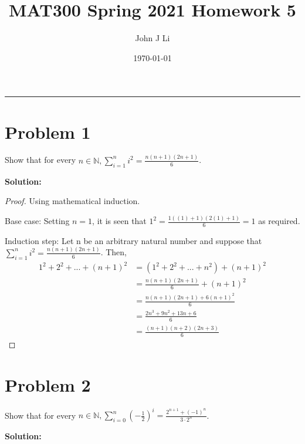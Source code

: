 \documentclass{article}
\title{MAT300 Spring 2021 Homework 5}
\date{\today}
\author{John J Li}
\begin{document}
    \maketitle
    \thispagestyle{empty}
    \noindent\rule{\textwidth}{0.8pt}


    \section*{Problem 1}

    Show that for every $n\in\mathbb{N}, \sum^n_{i=1} i^2 = \frac{n(n+1)(2n+1)}{6}$.

    \textbf{Solution:}

    \begin{proof}
        Using mathematical induction.

        Base case: Setting $n=1$, it is seen that $1^2=\frac{1((1)+1)(2(1)+1)}{6}=1$ as required.

        Induction step: Let n be an arbitrary natural number and suppose that $\sum^n_{i=1} i^2 = \frac{n(n+1)(2n+1)}{6}$.
        Then, 
        \begin{equation*}
            \begin{split}
                1^2+2^2+...+(n+1)^2 & =(1^2+2^2+...+n^2) + (n+1)^2 \\
                & = \frac{n(n+1)(2n+1)}{6} + (n+1)^2 \\
                & = \frac{n(n+1)(2n+1)+6(n+1)^2}{6} \\
                & = \frac{2n^3+9n^2+13n+6}{6} \\
                & = \frac{(n+1)(n+2)(2n+3)}{6}
            \end{split}
        \end{equation*}
    \end{proof}


    \section*{Problem 2}

    Show that for every $n\in\mathbb{N}, \sum^n_{i=0} (-\frac{1}{2})^i=\frac{2^{n+1}+(-1)^n}{3\cdot 2^n}$.

    \textbf{Solution:}
\end{document}
